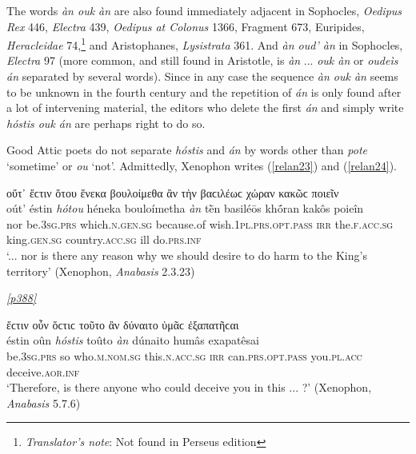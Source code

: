 The words \emph{àn ouk àn} are also found immediately adjacent in Sophocles, \textit{Oedipus Rex} 446, \textit{Electra} 439, \textit{Oedipus at Colonus} 1366, Fragment 673, Euripides, \textit{Heracleidae} 74,\footnote{\emph{Translator's note}: Not found in Perseus edition} and Aristophanes, \textit{Lysistrata} 361. And \emph{àn oud' àn} in Sophocles, \textit{Electra} 97 (more common, and still found in Aristotle, is \emph{àn} ... \emph{ouk àn} or \emph{oudeìs án} separated by several words). Since in any case the sequence \emph{àn ouk àn} seems to be unknown in the fourth century and the repetition of \emph{án} is only found after a lot of intervening material, the editors who delete the first \emph{án} and simply write \emph{hóstis ouk án} are perhaps right to do so.

Good Attic poets do not separate \emph{hóstis} and \emph{án} by words other than \emph{pote} `sometime' or \emph{ou} `not'. Admittedly, Xenophon writes (\ref{relan23}) and (\ref{relan24}).

\begin{exe}
\ex οὔτ᾽ ἔϲτιν ὅτου ἕνεκα βουλοίμεθα ἂν τὴν βαϲιλέωϲ χώραν κακῶϲ ποιεῖν\\
\gll oút' éstin \emph{hótou} héneka bouloímetha \emph{àn} tḕn basiléōs khṓran kakôs poieîn\\
nor be.\textsc{3sg.prs} which.\textsc{n.gen.sg} because.of wish.\textsc{1pl.prs.opt.pass} \textsc{irr} the.\textsc{f.acc.sg} king.\textsc{gen.sg} country.\textsc{acc.sg} ill do.\textsc{prs.inf}\\
\trans `... nor is there any reason why we should desire to do harm to the King's territory' (Xenophon, \textit{Anabasis} 2.3.23)
\label{relan23}
\end{exe}

\hyperlink{p388}{\emph{[p388]}}

\begin{exe}
\ex ἔϲτιν οὖν ὅϲτιϲ τοῦτο ἂν δύναιτο ὑμᾶϲ ἐξαπατῆϲαι\\
\gll éstin oûn \emph{hóstis} toûto \emph{àn} dúnaito humâs exapatêsai\\
be.\textsc{3sg.prs} so who.\textsc{m.nom.sg} this.\textsc{n.acc.sg} \textsc{irr} can.\textsc{prs.opt.pass} you.\textsc{pl.acc} deceive.\textsc{aor.inf}\\
\trans `Therefore, is there anyone who could deceive you in this ... ?' (Xenophon, \textit{Anabasis} 5.7.6)
\label{relan24}
\end{exe}

